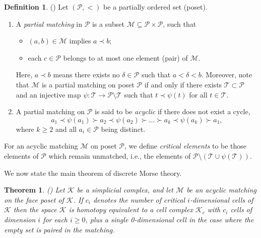 \documentclass[11pt,reqno,a4paper]{amsart}
\newtheorem{theorem}{Theorem}[section]
\theoremstyle{definition}
\newtheorem{definition}{Definition}[section]
\theoremstyle{theorem}
\theoremstyle{remark}
\begin{document}
\begin{definition} (\cite[{Definition~11.1}]{kozlovCombAlgTopo}) Let $(\mathcal{P}, <)$ be a partially ordered set (poset).
    \begin{enumerate}
        \item\label{defn: Partial matching} A \emph{partial matching} in $\mathcal{P}$ is a subset $\mathcal{M} \subseteq \mathcal{P}\times\mathcal{P}$, such that
        \begin{itemize}
            \item $\left(a,b\right) \in \mathcal{M}$ implies $a \prec b$;
            \item each $c \in \mathcal{P}$ belongs to at most one element (pair) of $\mathcal{M}$.
        \end{itemize}
        Here, $a \prec b$ means there exists no $\delta \in \mathcal{P}$ such that $a < \delta < b$. Moreover, note that $\mathcal{M}$ is a partial matching on poset $\mathcal{P}$ if and only if there exists $\mathcal{T} \subset \mathcal{P}$ and an injective map $\psi: \mathcal{T} \to \mathcal{P} \setminus \mathcal{T}$ such that $t \prec \psi\left(t\right)$ for all $t \in \mathcal{T}$.

        \item\label{Acyclic matching} A partial matching on $\mathcal{P}$ is said to be \emph{acyclic} if there does not exist a cycle, $$a_1 \prec \psi\left(a_1\right) \succ a_2 \prec \psi\left(a_2\right) \succ \dots \succ a_k \prec \psi\left(a_k\right) \succ a_1,$$
        where $k\geq2$ and all $a_i \in \mathcal{P}$ being distinct.
    \end{enumerate}

    For an acyclic matching $\mathcal{M}$ on poset $\mathcal{P}$, we define \textit{critical elements} to be those elements of $\mathcal{P}$ which remain unmatched, i.e., the elements of $\mathcal{P}\setminus (\mathcal{T}\cup \psi(\mathcal{T}))$.
\end{definition}

 We now state the main theorem of discrete Morse theory.

\begin{theorem}\label{theorem 1}(\cite[{Theorem~11.13}]{kozlovCombAlgTopo})
    Let $\mathcal{K}$ be a simplicial complex, and let $\mathcal{M}$ be an acyclic matching on the face poset of $\mathcal{K}$. If $c_i$ denotes the number of critical $i$-dimensional cells of $\mathcal{K}$ then the space $\mathcal{K}$ is homotopy equivalent to a cell complex $\mathcal{K}_c$ with $c_i$ cells of dimension $i$ for each $i \geq 0$, plus a single 0-dimensional cell in the case where the empty set is paired in the matching.
\end{theorem}
\end{document}
